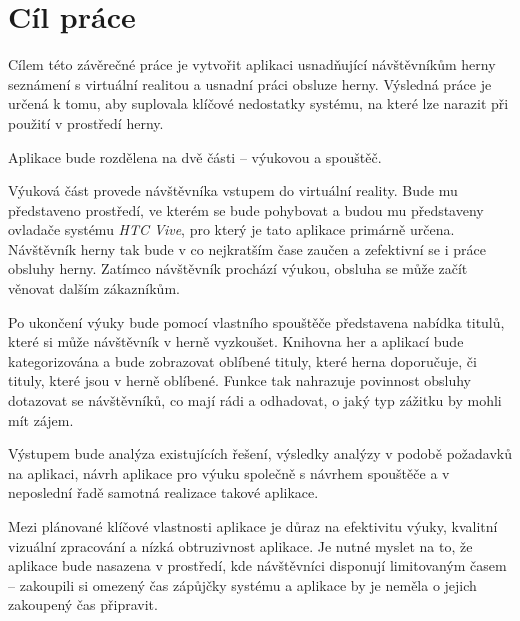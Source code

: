 \chapter{Cíl práce}\label{cuxedl-pruxe1ce}

Cílem této závěrečné práce je vytvořit aplikaci usnadňující návštěvníkům
herny seznámení s virtuální realitou a usnadní práci obsluze herny.
Výsledná práce je určená k tomu, aby suplovala klíčové nedostatky
systému, na které lze narazit při použití v prostředí herny.

Aplikace bude rozdělena na dvě části -- výukovou a spouštěč.

Výuková část provede návštěvníka vstupem do virtuální reality. Bude mu
představeno prostředí, ve kterém se bude pohybovat a budou mu
představeny ovladače systému \emph{HTC Vive}, pro který je tato aplikace
primárně určena. Návštěvník herny tak bude v co nejkratším čase zaučen a
zefektivní se i práce obsluhy herny. Zatímco návštěvník prochází výukou,
obsluha se může začít věnovat dalším zákazníkům.

Po ukončení výuky bude pomocí vlastního spouštěče představena nabídka
titulů, které si může návštěvník v herně vyzkoušet. Knihovna her a
aplikací bude kategorizována a bude zobrazovat oblíbené tituly, které
herna doporučuje, či tituly, které jsou v herně oblíbené. Funkce tak
nahrazuje povinnost obsluhy dotazovat se návštěvníků, co mají rádi a
odhadovat, o jaký typ zážitku by mohli mít zájem.

Výstupem bude analýza existujících řešení, výsledky analýzy v podobě
požadavků na aplikaci, návrh aplikace pro výuku společně s návrhem
spouštěče a v neposlední řadě samotná realizace takové aplikace.

Mezi plánované klíčové vlastnosti aplikace je důraz na efektivitu výuky,
kvalitní vizuální zpracování a nízká obtruzivnost aplikace. Je nutné
myslet na to, že aplikace bude nasazena v prostředí, kde návštěvníci
disponují limitovaným časem -- zakoupili si omezený čas zápůjčky systému
a aplikace by je neměla o jejich zakoupený čas připravit.
